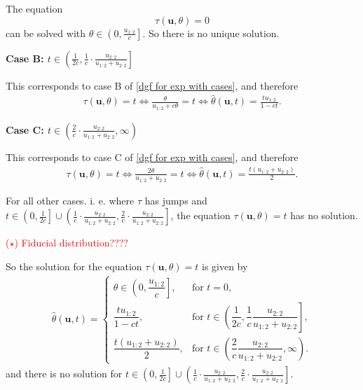 The equation 
\[
	\tau (\mathbf u, \theta) = 0
\]
can be solved with $\theta \in \left( 0, \frac{u_{1:2}}{c} \right]$. So there is no unique solution. 


\textbf{Case B: $t \in \left( \frac{1}{2c} , \frac{1}{c} \cdot \frac{u_{2:2}}{u_{1:2} + u_{2:2}}\right]$}

This corresponds to case B of \eqref{dgf for exp with cases}, and therefore
\begin{align}
	\tau(\mathbf u, \theta) = t 
	\Longleftrightarrow 
	\frac{\theta}{u_{1:2} + c\theta} = t
	\Longleftrightarrow 
	\hat \theta (\mathbf u, t) = \frac{t u_{1:2}}{1 - ct}.
\end{align}

\textbf{Case C: $t \in \left( \frac{2}{c} \cdot \frac{u_{2:2}}{u_{1:2} + u_{2:2}}, \infty \right)$}

This corresponds to case C of \eqref{dgf for exp with cases}, and therefore
\begin{align}
	\tau(\mathbf u, \theta) = t 
	\Longleftrightarrow 
	\frac{2\theta}{u_{1:2} + u_{2:2}} = t
	\Longleftrightarrow 
	\hat \theta (\mathbf u, t) = \frac{t (u_{1:2} + u_{2:2})}{2}.
\end{align}

For all other cases. i. e. where $\tau$ has jumps and $t \in \left( 0, \frac{1}{2c} \right] \cup \left( \frac{1}{c} \cdot \frac{u_{2:2}}{u_{1:2} + u_{2:2}}, \frac{2}{c} \cdot \frac{u_{2:2}}{u_{1:2} + u_{2:2}} \right]$, the equation $\tau(\mathbf u, \theta) = t$ has no solution. 


\textcolor{red}{($\star$) Fiducial distribution????}

So the solution for the equation $\tau (\mathbf u, \theta) = t$ is given by
\begin{align} \label{solution for all cases}
	\hat{\theta}(\mathbf{u},t)
	=
	\begin{cases}
		\theta \in \left(0,\dfrac{u_{1:2}}{c}\right],
		& \text{for } t=0, \\[8pt]
		\dfrac{t u_{1:2}}{1 - ct},
		& \text{for } t \in
		\left(
		\dfrac{1}{2c},
		\dfrac{1}{c}\dfrac{u_{2:2}}{u_{1:2}+u_{2:2}}
		\right], \\[10pt]
		\dfrac{t\left(u_{1:2}+u_{2:2}\right)}{2},
		& \text{for } t \in
		\left(
		\dfrac{2}{c}
		\dfrac{u_{2:2}}{u_{1:2}+u_{2:2}},
		\infty
		\right).
	\end{cases}
\end{align}
and there is no solution for $t \in \left( 0, \frac{1}{2c} \right] \cup \left( \frac{1}{c} \cdot \frac{u_{2:2}}{u_{1:2} + u_{2:2}}, \frac{2}{c} \cdot \frac{u_{2:2}}{u_{1:2} + u_{2:2}} \right]$.

